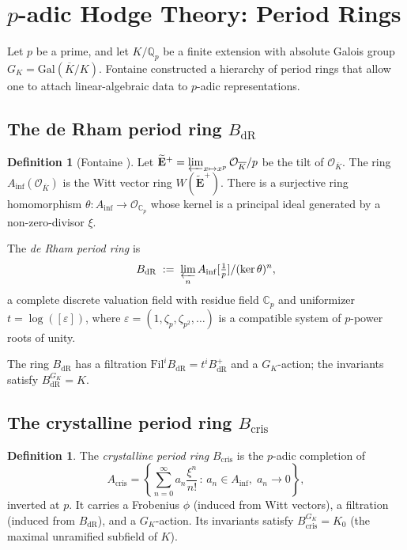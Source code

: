 \documentclass[12pt,a4paper]{amsart}
\theoremstyle{definition}
\newtheorem{definition}[theorem]{Definition}
\theoremstyle{remark}
\newcommand{\Gal}{\mathrm{Gal}}
\newcommand{\Qp}{\mathbb{Q}_p}
\newcommand{\BdR}{B_{\mathrm{dR}}}
\newcommand{\Bcris}{B_{\mathrm{cris}}}
\begin{document}
\section{$p$-adic Hodge Theory: Period Rings}\label{sec:padichg}

Let $p$ be a prime, and let $K/\Qp$ be a finite extension with absolute Galois group
$G_K = \Gal(\overline{K}/K)$. Fontaine constructed a hierarchy of period rings that allow
one to attach linear-algebraic data to $p$-adic representations.

\subsection{The de Rham period ring $\BdR$}

\begin{definition}[Fontaine \cite{Fontaine1982}]
  Let $\widetilde{\mathbf{E}}^+ = \varprojlim_{x \mapsto x^p} \mathcal{O}_{\overline{K}}/p$
  be the tilt of $\mathcal{O}_{\overline{K}}$. The ring $A_{\inf}(\mathcal{O}_{\overline{K}})$
  is the Witt vector ring $W(\widetilde{\mathbf{E}}^+)$. There is a surjective ring
  homomorphism $\theta\colon A_{\inf} \to \mathcal{O}_{\mathbb{C}_p}$ whose kernel is a
  principal ideal generated by a non-zero-divisor $\xi$.

  The \emph{de Rham period ring} is
  \[
    \BdR \;:=\; \varprojlim_{n} A_{\inf}[\tfrac{1}{p}] / (\ker\theta)^n,
  \]
  a complete discrete valuation field with residue field $\mathbb{C}_p$ and uniformizer
  $t = \log([\varepsilon])$, where $\varepsilon = (1, \zeta_p, \zeta_{p^2},\ldots)$ is a
  compatible system of $p$-power roots of unity.
\end{definition}

The ring $\BdR$ has a filtration $\mathrm{Fil}^i \BdR = t^i \BdR^+$ and a $G_K$-action;
the invariants satisfy $\BdR^{G_K} = K$.

\subsection{The crystalline period ring $\Bcris$}

\begin{definition}
  The \emph{crystalline period ring} $\Bcris$ is the $p$-adic completion of
  \[
    A_{\mathrm{cris}} = \left\{ \sum_{n=0}^\infty a_n \frac{\xi^n}{n!} \,:\, a_n \in A_{\inf}, \; a_n \to 0 \right\},
  \]
  inverted at $p$. It carries a Frobenius $\phi$ (induced from Witt vectors), a filtration
  (induced from $\BdR$), and a $G_K$-action. Its invariants satisfy $\Bcris^{G_K} = K_0$
  (the maximal unramified subfield of $K$).
\end{definition}
\end{document}
